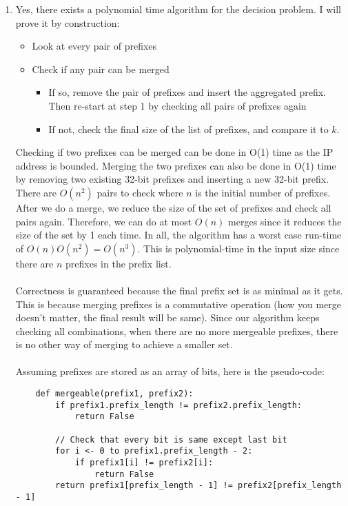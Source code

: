 \documentclass[12pt]{article}
\begin{document}
\begin{enumerate}
    \item Yes, there exists a polynomial time algorithm for the decision problem. I will prove it by construction:
    \begin{itemize}
    \item Look at every pair of prefixes
    \item Check if any pair can be merged
    \begin{itemize}
    	\item If so, remove the pair of prefixes and insert the aggregated prefix. Then re-start at step 1 by checking all pairs of prefixes again
    	\item If not, check the final size of the list of prefixes, and compare it to $k$.
    \end{itemize}
    \end{itemize}
    Checking if two prefixes can be merged can be done in O(1) time as the IP address is bounded. Merging the two prefixes can also be done in O(1) time by removing two existing 32-bit prefixes and inserting a new 32-bit prefix. There are $O(n^2)$ pairs to check where $n$ is the initial number of prefixes. After we do a merge, we reduce the size of the set of prefixes and check all pairs again. Therefore, we can do at most $O(n)$ merges since it reduces the size of the set by 1 each time. In all, the algorithm has a worst case run-time of $O(n)O(n^2) = O(n^3)$. This is polynomial-time in the input size since there are $n$ prefixes in the prefix list. \\ \\ Correctness is guaranteed because the final prefix set is as minimal as it gets. This is because merging prefixes is a commutative operation (how you merge doesn't matter, the final result will be same). Since our algorithm keeps checking all combinations, when there are no more mergeable prefixes, there is no other way of merging to achieve a smaller set. \\ \\ Assuming prefixes are stored as an array of bits, here is the pseudo-code: 
    \begin{verbatim}
    def mergeable(prefix1, prefix2):
        if prefix1.prefix_length != prefix2.prefix_length:
            return False
            
        // Check that every bit is same except last bit
        for i <- 0 to prefix1.prefix_length - 2:
            if prefix1[i] != prefix2[i]:
                return False
        return prefix1[prefix_length - 1] != prefix2[prefix_length - 1]


\end{verbatim}
\end{enumerate}
\end{document}
